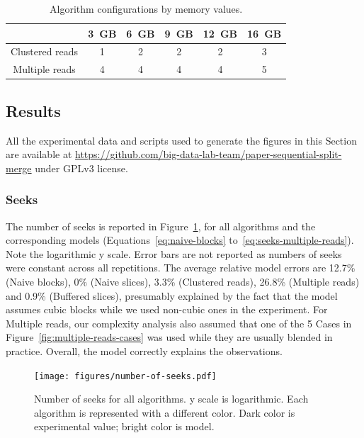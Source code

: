 \documentclass[10pt, conference, compsocconf]{IEEEtran}
\begin{document}
\begin{table}
  \centering
\begin{footnotesize}
\begin{tabular}{|c|ccccc|}
  \hline
                 & 3~GB & 6~GB & 9~GB & 12~GB & 16~GB\\
  \hline
  Clustered  reads &  1 &  2 &  2 &  2 &  3 \\
  Multiple reads &  4 &  4 &  4 &  4 &  5\\
  \hline
\end{tabular}
\end{footnotesize}
\caption{Algorithm configurations by memory values.}
\label{table:configs}
\end{table}

\subsection{Results}

All the experimental data and scripts used to generate the figures in
this Section are available at
\url{https://github.com/big-data-lab-team/paper-sequential-split-merge}
under GPLv3 license.

\subsubsection{Seeks}

The number of seeks is reported in Figure~\ref{fig:number-of-seeks},
for all algorithms and the corresponding models
(Equations~\ref{eq:naive-blocks}
to~\ref{eq:seeks-multiple-reads}). Note the logarithmic y scale. Error
bars are not reported as numbers of seeks were constant across all
repetitions. The average relative model errors are 12.7\% (Naive
blocks), 0\% (Naive slices), 3.3\% (Clustered reads), 26.8\% (Multiple
reads) and 0.9\% (Buffered slices), presumably explained by the fact
that the model assumes cubic blocks while we used non-cubic ones in
the experiment. For Multiple reads, our complexity analysis also
assumed that one of the 5 Cases in
Figure~\ref{fig:multiple-reads-cases} was used while they are usually
blended in practice. Overall, the model correctly explains the
observations.
\begin{figure}[h]
  \centering
  \texttt{[image: figures/number-of-seeks.pdf]}
  \hfill
  \caption{Number of seeks for all algorithms. y scale is logarithmic. Each algorithm is
    represented with a different color. Dark color is experimental
    value; bright color is model.}
\label{fig:number-of-seeks}
\end{figure}
\end{document}
